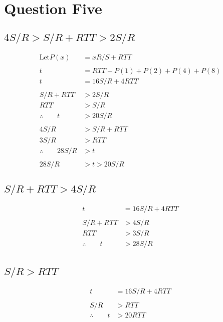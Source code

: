 \documentclass[a4paper]{article}
\begin{document}
\section{Question Five}

\subsection{$4S/R>S/R+RTT >2S/R$}

\begin{align*}
\text{Let} P(x) &= xR/S + \mathit{RTT} \\
\\
t &= \mathit{RTT} + P(1) + P(2) + P(4) + P(8) \\
t &= 16S/R + 4\mathit{RTT} \\
\\
S/R + \mathit{RTT} &> 2S/R \\
\mathit{RTT} &> S/R \\
\therefore\qquad t &> 20S/R \\
\\
4S/R &> S/R + RTT \\
3S/R &> RTT \\
\therefore\qquad 28S/R &> t \\
\\
28S/R &> t > 20S/R
\end{align*}

\subsection{$S/R+RTT >4S/R$}

\begin{align*}
t &= 16S/R + 4\mathit{RTT} \\
\\
S/R + \mathit{RTT} &> 4S/R \\
\mathit{RTT} &> 3S/R \\
\therefore\qquad t &> 28S/R \\
\end{align*}

\subsection{$S/R>RTT$}

\begin{align*}
t &= 16S/R + 4\mathit{RTT} \\
\\
S/R &> \mathit{RTT} \\
\therefore\qquad t &> 20\mathit{RTT} \\
\end{align*}
\end{document}
